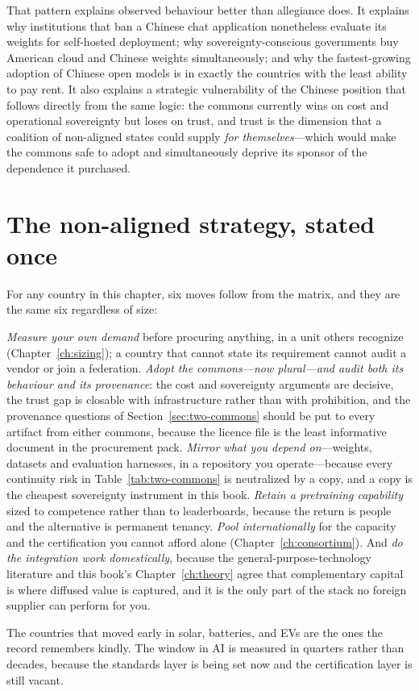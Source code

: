 That pattern explains observed behaviour better than allegiance does. It explains why institutions that ban a Chinese chat application nonetheless evaluate its weights for self-hosted deployment; why sovereignty-conscious governments buy American cloud and Chinese weights simultaneously; and why the fastest-growing adoption of Chinese open models is in exactly the countries with the least ability to pay rent. It also explains a strategic vulnerability of the Chinese position that follows directly from the same logic: the commons currently wins on cost and operational sovereignty but loses on trust, and trust is the dimension that a coalition of non-aligned states could supply \emph{for themselves}---which would make the commons safe to adopt and simultaneously deprive its sponsor of the dependence it purchased.

\section{The non-aligned strategy, stated once}

For any country in this chapter, six moves follow from the matrix, and they are the same six regardless of size:

\emph{Measure your own demand} before procuring anything, in a unit others recognize (Chapter~\ref{ch:sizing}); a country that cannot state its requirement cannot audit a vendor or join a federation. \emph{Adopt the commons---now plural---and audit both its behaviour and its provenance}: the cost and sovereignty arguments are decisive, the trust gap is closable with infrastructure rather than with prohibition, and the provenance questions of Section~\ref{sec:two-commons} should be put to every artifact from either commons, because the licence file is the least informative document in the procurement pack. \emph{Mirror what you depend on}---weights, datasets and evaluation harnesses, in a repository you operate---because every continuity risk in Table~\ref{tab:two-commons} is neutralized by a copy, and a copy is the cheapest sovereignty instrument in this book. \emph{Retain a pretraining capability} sized to competence rather than to leaderboards, because the return is people and the alternative is permanent tenancy. \emph{Pool internationally} for the capacity and the certification you cannot afford alone (Chapter~\ref{ch:consortium}). And \emph{do the integration work domestically}, because the general-purpose-technology literature and this book's Chapter~\ref{ch:theory} agree that complementary capital is where diffused value is captured, and it is the only part of the stack no foreign supplier can perform for you.

The countries that moved early in solar, batteries, and EVs are the ones the record remembers kindly. The window in AI is measured in quarters rather than decades, because the standards layer is being set now and the certification layer is still vacant.
